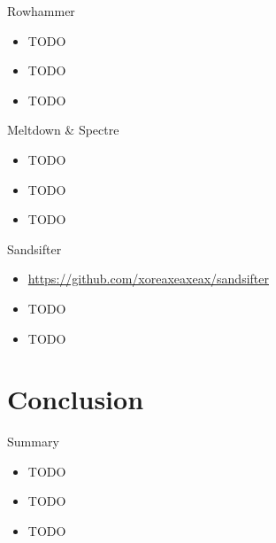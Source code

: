 \documentclass{curs}
\begin{document}
\begin{frame}{Rowhammer}
  \begin{itemize}
    \item TODO
    \item TODO
    \item TODO
  \end{itemize}
\end{frame}

\begin{frame}{Meltdown \& Spectre}
  \begin{itemize}
    \item TODO
    \item TODO
    \item TODO
  \end{itemize}
\end{frame}

\begin{frame}{Sandsifter}
  \begin{itemize}
    \item \url{https://github.com/xoreaxeaxeax/sandsifter}
    \item TODO
    \item TODO
  \end{itemize}
\end{frame}


\section{Conclusion}

\begin{frame}{Summary}
  \begin{itemize}
    \item TODO
    \item TODO
    \item TODO
  \end{itemize}
\end{frame}
\end{document}
